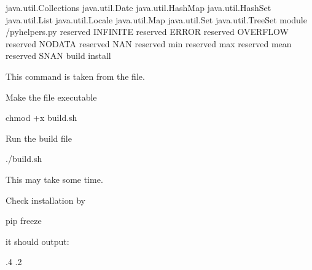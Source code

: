 \documentclass[letterpaper,10pt,english]{sphinxmanual}
\begin{document}
\begin{sphinxVerbatim}[commandchars=\\\{\}]
java.util.Collections 
java.util.Date 
java.util.HashMap 
java.util.HashSet 
java.util.List 
java.util.Locale 
java.util.Map 
java.util.Set 
java.util.TreeSet 
\PYGZhy{}\PYGZhy{}module /pyhelpers.py 
\PYGZhy{}\PYGZhy{}reserved INFINITE 
\PYGZhy{}\PYGZhy{}reserved ERROR 
\PYGZhy{}\PYGZhy{}reserved OVERFLOW 
\PYGZhy{}\PYGZhy{}reserved NO\PYGZus{}DATA 
\PYGZhy{}\PYGZhy{}reserved NAN 
\PYGZhy{}\PYGZhy{}reserved min 
\PYGZhy{}\PYGZhy{}reserved max 
\PYGZhy{}\PYGZhy{}reserved mean 
\PYGZhy{}\PYGZhy{}reserved SNAN 
\PYGZhy{}\PYGZhy{}build 
\PYGZhy{}\PYGZhy{}install
\end{sphinxVerbatim}

This command is taken from the   file.

Make the file executable

%
\begin{sphinxVerbatim}[commandchars=\\\{\}]
chmod +x build.sh
\end{sphinxVerbatim}

Run the build file

%
\begin{sphinxVerbatim}[commandchars=\\\{\}]
./build.sh
\end{sphinxVerbatim}

This may take some time.

Check installation by

%
\begin{sphinxVerbatim}[commandchars=\\\{\}]
pip freeze
\end{sphinxVerbatim}

it should output:

%
\begin{sphinxVerbatim}[commandchars=\\\{\}]
.4
.2
\end{sphinxVerbatim}
\end{document}
